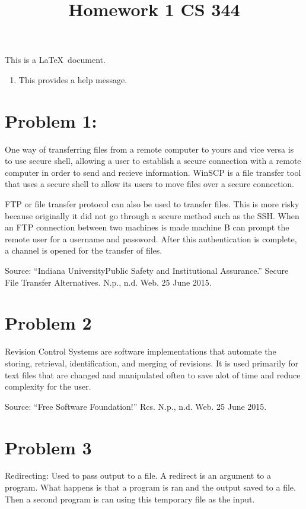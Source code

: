 \documentclass[letterpaper,10pt,titlepage]{article}
\begin{document}
This is a \LaTeX\ document.

\title{Homework 1 CS 344}


\begin{enumerate}

\item This provides a help message.

\end{enumerate}


\section{Problem 1:}
One way of transferring files from a remote computer to yours and vice versa is to use secure shell, allowing a user to establish a secure connection with a remote computer in order to send and recieve information. WinSCP is a file transfer tool that uses a secure shell to allow its users to move files over a secure connection.

FTP or file transfer protocol can also be used to transfer files. This is more risky because originally it did not go through a secure method such as the SSH. When an FTP connection between two machines is made machine B can prompt the remote user for a username and password. After this authentication is complete, a channel is opened for the transfer of files.

Source:
``Indiana UniversityPublic Safety and Institutional Assurance.'' Secure File Transfer Alternatives. N.p., n.d. Web. 25 June 2015.


\section{Problem 2}
Revision Control Systems are software implementations that automate the storing, retrieval, identification, and merging of revisions. It is used primarily for text files that are changed and manipulated often to save alot of time and reduce complexity for the user.

Source:
``Free Software Foundation!'' Rcs. N.p., n.d. Web. 25 June 2015.

\section{Problem 3}
Redirecting: Used to pass output to a file. A redirect is an argument to a program.  What happens is that a program is ran and the output saved to a file. Then a second program  is ran using this temporary file as the input.
\end{document}
